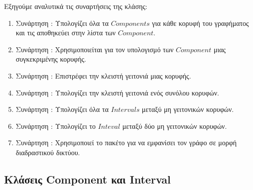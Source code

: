

Εξηγούμε αναλυτικά τις συναρτήσεις της κλάσης:

\begin{enumerate}
	\item Συνάρτηση : Υπολογίζει όλα τα $Components$ για κάθε κορυφή του γραφήματος και τις αποθηκεύει στην λίστα των $Component$.
	
	\item Συνάρτηση : Χρησιμοποιείται για τον υπολογισμό των $Component$ μιας συγκεκριμένης κορυφής.
	
	\item Συνάρτηση : Επιστρέφει την κλειστή γειτονιά μιας κορυφής.
	
	\item Συνάρτηση : Υπολογίζει την κλειστή γειτονιά ενός συνόλου κορυφών.
	
	\item Συνάρτηση : Υπολογίζει όλα τα $Intervals$ μεταξύ μη γειτονικών κορυφών.
	
	\item Συνάρτηση : Υπολογίζει το $Inteval$ μεταξύ δύο μη γειτονικών κορυφών.
	
	\item Συνάρτηση : Χρησιμοποιεί το πακέτο  για να εμφανίσει τον γράφο σε μορφή διαδραστικού δικτύου.
	
\end{enumerate}

\subsection{Κλάσεις Component και Interval}




